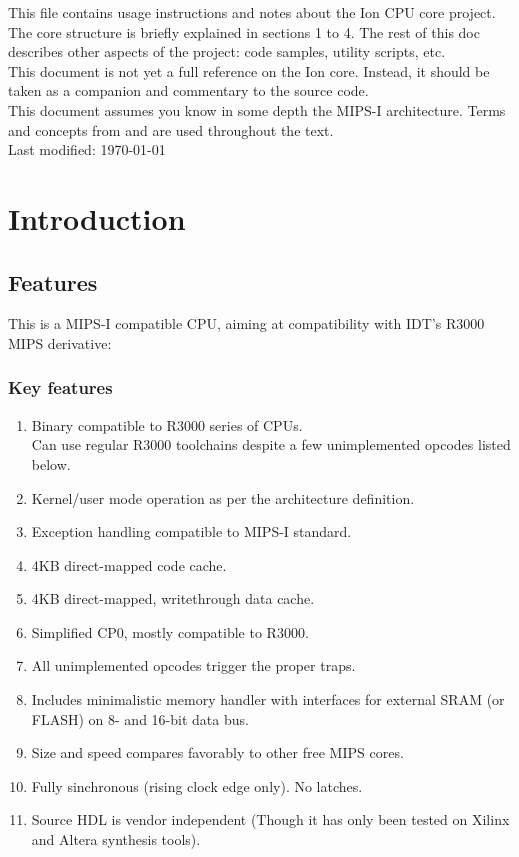 \clearpage
This file contains usage instructions and notes about the Ion CPU core project.
The core structure is briefly explained in sections 1 to 4. The rest of this 
doc describes other aspects of the project: code samples, utility scripts, 
etc.\\

This document is not yet a full reference on the Ion core. Instead, it should be 
taken as a companion and commentary to the source code.\\

This document assumes you know in some depth the MIPS-I architecture. Terms and
concepts from \cite['See MIPS Run']{see_mips_run} and 
\cite['IDT R3K Reference Manual']{r3k_ref_man} are used throughout the text.\\

Last modified: \today
\clearpage

\chapter{Introduction}

\section{Features}
\label{features}

This is a MIPS-I compatible CPU, aiming at compatibility with IDT's R3000 
MIPS derivative:\\

\begin{framed}
\subsection{Key features}
\begin{enumerate}
    \item Binary compatible to R3000 series of CPUs.\\
        Can use regular R3000 toolchains despite a few unimplemented opcodes 
        listed below.
    \item Kernel/user mode operation as per the architecture definition.
    \item Exception handling compatible to MIPS-I standard.
    \item 4KB direct-mapped code cache.
    \item 4KB direct-mapped, writethrough data cache.
    \item Simplified CP0, mostly compatible to R3000.
    \item All unimplemented opcodes trigger the proper traps.
    \item Includes minimalistic memory handler with interfaces for external 
          SRAM (or FLASH) on 8- and 16-bit data bus.
    \item Size and speed compares favorably to other free MIPS cores.
    \item Fully sinchronous (rising clock edge only). No latches.
    \item Source HDL is vendor independent (Though it has only been tested on 
          Xilinx and Altera synthesis tools).
\end{enumerate}
\end{framed}


